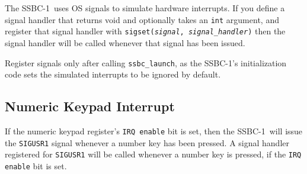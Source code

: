 \documentclass[12pt]{article}
\newcommand{\SSBC}{SSBC-1}
\begin{document}
The \SSBC\ uses OS signals to simulate hardware interrupts. If you define a
signal handler that returns void and optionally takes an \texttt{int} argument,
and register that signal handler with \texttt{sigset(\textit{signal},
\textit{signal\_handler})} then the signal handler will be called whenever that
signal has been issued.

Register signals only after calling \texttt{ssbc\_launch}, as the \SSBC's
initialization code sets the simulated interrupts to be ignored by default.

\subsection{Numeric Keypad Interrupt} \label{sec:numberInterrupt}

If the numeric keypad register's \texttt{IRQ enable} bit is set, then the
\SSBC\ will issue the \texttt{SIGUSR1} signal whenever a number key has been
pressed. A signal handler registered for \texttt{SIGUSR1} will be called
whenever a number key is pressed, if the \texttt{IRQ enable} bit is set.
\end{document}
